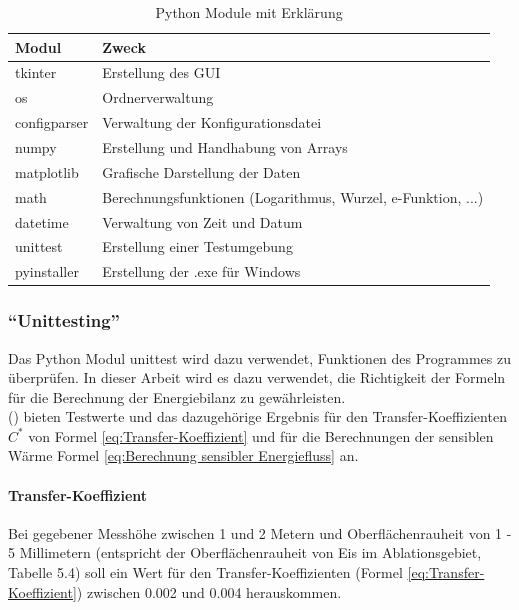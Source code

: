 \documentclass[11pt,a4paper]{article}
\begin{document}
\begin{table}[H]
\centering
{} 
\caption{Python Module mit Erklärung}
\label{tab:Python Module}
\begin{tabular}{|l|l|}
\hline
\textbf{Modul} & \textbf{Zweck}                                \\ \hline
tkinter             & Erstellung des GUI         \\
os             & Ordnerverwaltung         \\
configparser             & Verwaltung der Konfigurationsdatei         \\
numpy          & Erstellung und Handhabung von Arrays          \\
matplotlib     & Grafische Darstellung der Daten               \\
math		   & Berechnungsfunktionen (Logarithmus, Wurzel, e-Funktion, ...)   \\  
datetime		   & Verwaltung von Zeit und Datum   \\
unittest		   & Erstellung einer Testumgebung   \\  
pyinstaller		   & Erstellung der .exe für Windows   \\ \hline


\end{tabular}
\end{table}
\vspace{0.3cm}

\subsubsection{``Unittesting''}
Das Python Modul unittest wird dazu verwendet, Funktionen des Programmes zu überprüfen. In dieser Arbeit wird es dazu verwendet, die Richtigkeit der Formeln für die Berechnung der Energiebilanz zu gewährleisten.\\

\citeauthor{ThePhysicsOfGlaciers} (\citeyear[157]{ThePhysicsOfGlaciers}) bieten Testwerte und das dazugehörige Ergebnis für den Transfer-Koeffizienten $C^*$ von Formel \ref{eq:Transfer-Koeffizient} und für die Berechnungen der sensiblen Wärme Formel \ref{eq:Berechnung sensibler Energiefluss} an.


\paragraph{Transfer-Koeffizient}

Bei gegebener Messhöhe zwischen 1 und 2 Metern und Oberflächenrauheit von  1 - 5 Millimetern (entspricht der Oberflächenrauheit von Eis im Ablationsgebiet, Tabelle 5.4) soll ein Wert für den Transfer-Koeffizienten (Formel \ref{eq:Transfer-Koeffizient}) zwischen 0.002 und 0.004 herauskommen.\\
\end{document}

